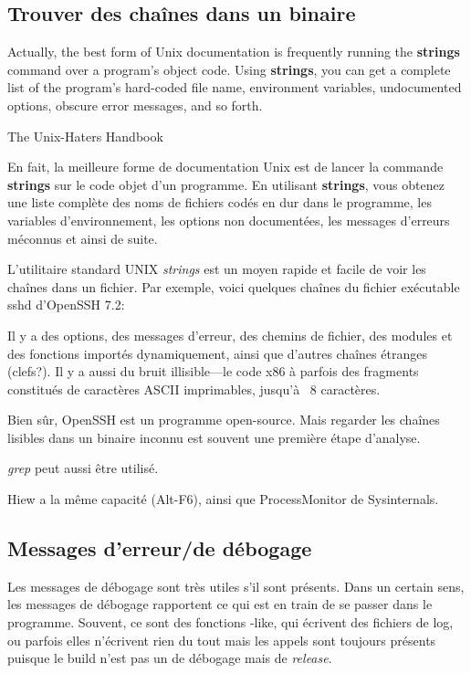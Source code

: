 \label{sec:digging_strings}



\subsection{Trouver des chaînes dans un binaire}

\epigraph{Actually, the best form of Unix documentation is frequently running the
\textbf{strings} command over a program’s object code. Using \textbf{strings}, you can get
a complete list of the program’s hard-coded file name, environment variables,
undocumented options, obscure error messages, and so forth.}{The Unix-Haters Handbook}
En fait, la meilleure forme de documentation Unix est de lancer la commande
\textbf{strings} sur le code objet d'un programme. En utilisant \textbf{strings},
vous obtenez une liste complète des noms de fichiers codés en dur dans le programme,
les variables d'environnement, les options non documentées, les messages d'erreurs
méconnus et ainsi de suite.

L'utilitaire standard UNIX \emph{strings} est un moyen rapide et facile de voir les
chaînes dans un fichier.
Par exemple, voici quelques chaînes du fichier exécutable sshd d'OpenSSH 7.2:



Il y a des options, des messages d'erreur, des chemins de fichier, des modules et
des fonctions importés dynamiquement, ainsi que d'autres chaînes étranges (clefs?).
Il y a aussi du bruit illisible---le code x86 à parfois des fragments constitués de
caractères ASCII imprimables, jusqu'à ~8 caractères.

Bien sûr, OpenSSH est un programme open-source.
Mais regarder les chaînes lisibles dans un binaire inconnu est souvent une première
étape d'analyse.

\emph{grep} peut aussi être utilisé.

Hiew a la même capacité (Alt-F6), ainsi que ProcessMonitor de Sysinternals.

\subsection{Messages d'erreur/de débogage}

Les messages de débogage sont très utiles s'il sont présents.
Dans un certain sens, les messages de débogage rapportent ce qui est en train de
se passer dans le programme. Souvent, ce sont des fonctions \printf-like, qui écrivent
des fichiers de log, ou parfois elles n'écrivent rien du tout mais les appels sont
toujours présents puisque le build n'est pas un de débogage mais de \emph{release}.
\myindex{\oracle}

